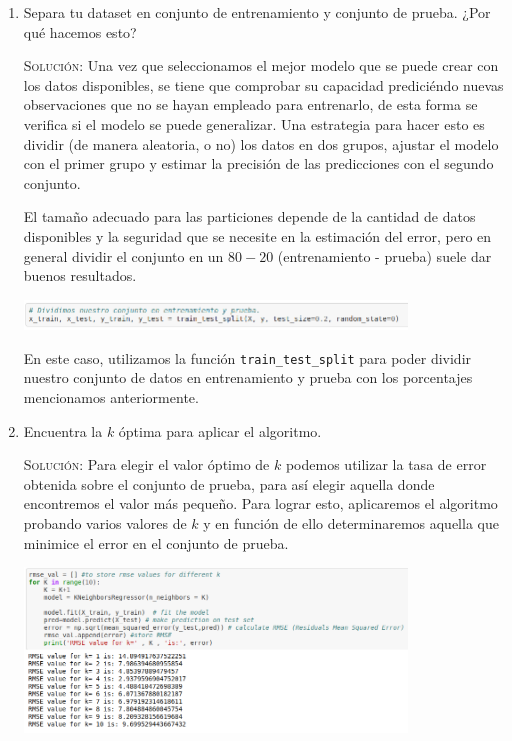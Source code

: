 \documentclass[letterpaper,11pt]{article}
\begin{document}
\begin{enumerate}
\begin{enumerate}
        \item Separa tu dataset en conjunto de entrenamiento y conjunto de 
        prueba. ¿Por qué hacemos esto?

        \textsc{Solución:} Una vez que seleccionamos el mejor modelo que se 
        puede crear con los datos disponibles, se tiene que comprobar su 
        capacidad prediciéndo nuevas observaciones que no se hayan empleado 
        para entrenarlo, de esta forma se verifica si el modelo se puede 
        generalizar. Una estrategia para hacer esto es dividir (de manera 
        aleatoria, o no) los datos en dos grupos, ajustar el modelo con el 
        primer grupo y estimar la precisión de las predicciones con el 
        segundo conjunto.

        El tamaño adecuado para las particiones depende de la cantidad de 
        datos disponibles y la seguridad que se necesite en la estimación 
        del error, pero en general dividir el conjunto en un $80-20$ 
        (entrenamiento - prueba) suele dar buenos resultados.
        \begin{center}
            \includegraphics[width=0.8\textwidth]{imagenes/train.png}
        \end{center}

        En este caso, utilizamos la función \texttt{train\_test\_split} para 
        poder dividir nuestro conjunto de datos en entrenamiento y prueba con 
        los porcentajes mencionamos anteriormente. 

        \item Encuentra la $k$ óptima para aplicar el algoritmo.
        
        \textsc{Solución:} Para elegir el valor óptimo de $k$ podemos utilizar 
        la tasa de error obtenida sobre el conjunto de prueba, para así elegir 
        aquella donde encontremos el valor más pequeño. Para lograr esto, 
        aplicaremos el algoritmo probando varios valores de $k$ y en función de 
        ello determinaremos aquella que minimice el error en el conjunto de 
        prueba.
        \begin{center}
            \includegraphics[width=0.8\textwidth]{imagenes/k_value.png}
        \end{center}


\end{enumerate}
\end{enumerate}
\end{document}

